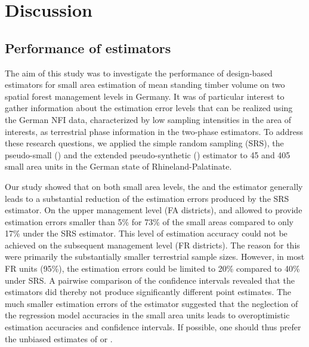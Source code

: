 \section{Discussion} %
\label{sec:Dis}

\subsection{Performance of estimators}

The aim of this study was to investigate the performance of design-based estimators for small area estimation of mean standing timber volume on two spatial forest management levels in Germany. It was of particular interest to gather information about the estimation error levels that can be realized using the German NFI data, characterized by low sampling intensities in the area of interests, as terrestrial phase information in the two-phase estimators. To address these research questions, we applied the simple random sampling (SRS), the pseudo-small (\psmall{}) and the extended pseudo-synthetic (\extpsynth{}) estimator to 45 and 405 small area units in the German state of Rhineland-Palatinate.\par

Our study showed that on both small area levels, the \psmall{} and the \extpsynth{} estimator generally leads to a substantial reduction of the estimation errors produced by the SRS estimator. On the upper management level (FA districts), \psmall{} and \extpsynth{} allowed to provide estimation errors smaller than 5\% for 73\% of the small areas compared to only 17\% under the SRS estimator. This level of estimation accuracy could not be achieved on the subsequent management level (FR districts). The reason for this were primarily the substantially smaller terrestrial sample sizes. However, in most FR units (95\%), the estimation errors could be limited to 20\% compared to 40\% under SRS. A pairwise comparison of the confidence intervals revealed that the estimators did thereby not produce significantly different point estimates. The much smaller estimation errors of the \psynth{} estimator suggested that the neglection of the regression model accuracies in the small area units leads to overoptimistic estimation accuracies and confidence intervals. If possible, one should thus prefer the unbiased estimates of \psmall{} or \extpsynth{}.\par

